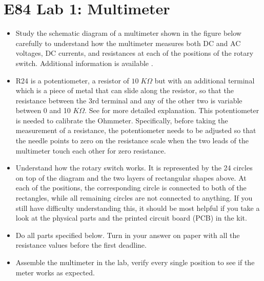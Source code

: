 \usepackage{html}


\section*{E84 Lab 1: Multimeter}



\begin{itemize}

  \item Study the schematic diagram of a multimeter shown in the figure
    below carefully to understand how the multimeter measures both DC and
    AC voltages, DC currents, and resistances at each of the positions of 
    the rotary switch. Additional information is available 
    .

  \item R24 is a potentiometer, a resistor of $10\;K\Omega$ but with an 
    additional terminal which is a piece of metal that can slide along the
    resistor, so that the resistance between the 3rd terminal and any of 
    the other two is variable between 0 and 10 $K\Omega$. See
    for more detailed explanation. This potentiometer is needed to calibrate
    the Ohmmeter. Specifically, before taking the measurement of a resistance,
    the potentiometer needs to be adjusted so that the needle points to 
    zero on the resistance scale when the two leads of the multimeter touch
    each other for zero resistance.
    
  \item Understand how the rotary switch works. It is represented by the 
    24 circles on top of the diagram and the two layers of rectangular shapes
    above. At each of the positions, the corresponding circle is connected to
    both of the rectangles, while all remaining circles are not connected to
    anything. If you still have difficulty understanding this, it should be
    most helpful if you take a look at the physical parts and the printed 
    circuit board (PCB) in the kit.

  \item Do all parts specified below. Turn in your answer on paper with all 
    the resistance values before the first deadline. 

  \item Assemble the multimeter in the lab, verify every single position 
    to see if the meter works as expected.
    
\end{itemize}

